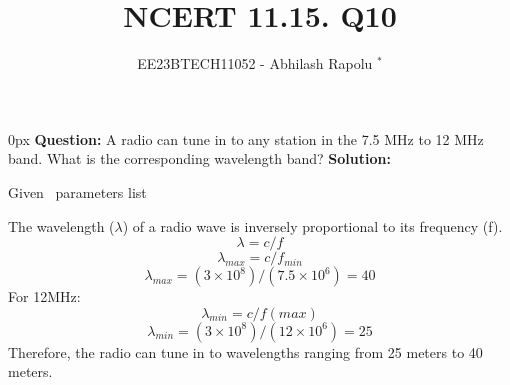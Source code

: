 \documentclass[journal,12pt,twocolumn]{IEEEtran}
\begin{document}

\vspace{3cm}
\title{NCERT 11.15. Q10}
\author{EE23BTECH11052 - Abhilash Rapolu $^{*}$%
}
\maketitle
\newpage
\bigskip
\renewcommand{\thetable}{\arabic{table}}

\parindent 0px
\textbf{Question:} A radio can tune in to any station in the 7.5 MHz to 12 MHz band.
 What is the corresponding wavelength band? 
\textbf{Solution:}  
\begin{table}[htbp] \small
\centering

\caption{Given \, parameters list}\end{table}
The wavelength ($\lambda$) of a radio wave is inversely proportional to its frequency (f).
\bgroup \obeylines
$$\lambda=c/f$$
$$\lambda_{max}=c/f_{min}$$
\egroup
\begin{equation}
\lambda_{max}=(3\times10^{8})/(7.5\times10^{6})=40
\end{equation}
For 12MHz:
$$\lambda_{min}=c/f(max)$$
\begin{equation}
\lambda_{min}=(3\times10^{8})/(12\times10^{6})=25
\end{equation}
Therefore, the radio can tune in to wavelengths ranging from 25 meters to 40 meters.
\end{document}
